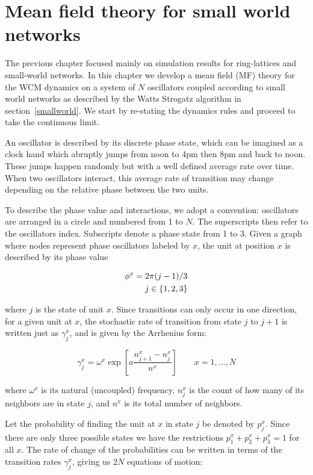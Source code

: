 \chapter{Mean field theory for small world networks}

The previous chapter focused mainly on simulation results for ring-lattices and small-world networks. In this chapter we develop a mean
field (MF) theory for the WCM dynamics on a system of $N$ oscillators coupled according to small world networks as described by the
Watts Strogatz algorithm in section~\ref{smallworld}. We start by re-stating the dynamics rules and proceed to take the continuous
limit.

An oscillator is described by its discrete phase state, which can be imagined as a clock hand which abruptly jumps from noon to 4pm
then 8pm and back to noon. These jumps happen randomly but with a well defined average rate over time. When two oscillators interact,
this average rate of transition may change depending on the relative phase between the two units.

To describe the phase value and interactions, we adopt a convention: oscillators are arranged in a circle and numbered from 1 to $N$.
The superscripts then refer to the oscillators index. Subscripts denote a phase state from 1 to 3. Given a graph where nodes represent
phase oscillators labeled by $x$, the unit at position $x$ is described by its phase value

\begin{align}
    \phi^x = 2\pi (j-1)/3 \\
    j \in \{1,2,3\} \notag
\end{align}

\noindent where $j$ is the state of unit $x$. Since transitions can only occur in one direction, for a given unit at $x$, the
stochastic rate of transition from state $j$ to $j+1$ is written just as $\gamma^x_j$, and is given by the Arrhenius form:

\begin{equation}
    \gamma^x_j = \omega^x\exp\left[ a\frac{n^x_{j+1} - n^x_j}{n^x} \right] \qquad x=1,\dots, N
    \label{rate}
\end{equation}

\noindent where $\omega^x$ is its natural (uncoupled) frequency, $n^x_j$ is the count of how many of its neighbors are in state $j$,
and $n^x$ is its total number of neighbors.

Let the probability of finding the unit at $x$ in state $j$ be denoted by $p^x_j$. Since there are only three possible states we have
the restrictions $p^x_1+p^x_2+p^x_3=1$ for all $x$. The rate of change of the probabilities can be written in terms of the transition
rates $\gamma^x_j$, giving us $2N$ equations of motion:

